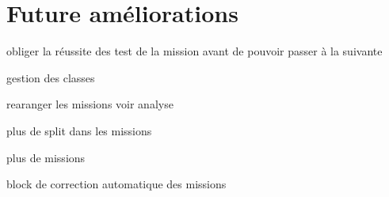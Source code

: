 \chapter{Future améliorations}
obliger la réussite des test de la mission avant de pouvoir passer à la suivante

gestion des classes

rearanger les missions voir analyse

plus de split dans les missions

plus de missions

block de correction automatique des missions

